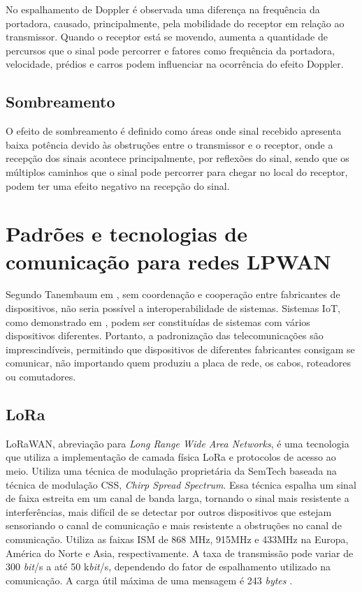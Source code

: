 No espalhamento de Doppler é observada uma diferença na frequência da portadora, causado, principalmente, pela mobilidade do receptor em relação ao transmissor. Quando o receptor está se movendo, aumenta a quantidade de percursos que o sinal pode percorrer e fatores como frequência da portadora, velocidade, prédios e carros podem influenciar na ocorrência do efeito Doppler.


\subsection{Sombreamento}
O efeito de sombreamento é definido como áreas onde sinal recebido apresenta baixa potência devido às obstruções entre o transmissor e o receptor, onde a recepção dos sinais acontece principalmente, por reflexões do sinal, sendo que os múltiplos caminhos que o sinal pode percorrer para chegar no local do receptor, podem ter uma efeito negativo na recepção do sinal.


\section{Padrões e tecnologias de comunicação para redes LPWAN}
\label{padrõesSF}
Segundo Tanembaum em \cite{tanembaum2011}, sem coordenação e cooperação entre fabricantes de dispositivos, não seria possível a interoperabilidade de sistemas. Sistemas IoT, como demonstrado em \cite{sotres2017practical}, podem ser constituídas de sistemas com vários dispositivos diferentes. Portanto, a padronização das telecomunicações são imprescindíveis, permitindo que dispositivos de diferentes fabricantes consigam se comunicar, não importando quem produziu a placa de rede, os cabos, roteadores ou comutadores.

\subsection{LoRa}
LoRaWAN, abreviação para \emph{Long Range Wide Area Networks}, é uma tecnologia que utiliza a implementação de camada física LoRa e protocolos de acesso ao meio. Utiliza uma técnica de modulação proprietária da SemTech baseada na técnica de modulação CSS, \emph{Chirp Spread Spectrum}. Essa técnica espalha um sinal de faixa estreita em um canal de banda larga, tornando o sinal mais resistente a interferências, mais difícil de se detectar por outros dispositivos que estejam sensoriando o canal de comunicação e mais resistente a obstruções no canal de comunicação. Utiliza as faixas ISM de 868 MHz, 915MHz e 433MHz na Europa, América do Norte e Asia, respectivamente. A taxa de transmissão pode variar de 300 \emph{bit}/s a até 50 k\emph{bit}/s, dependendo do fator de espalhamento utilizado na comunicação. A carga útil máxima de uma mensagem é 243 \emph{bytes} \cite{mekki2019comparative}.

